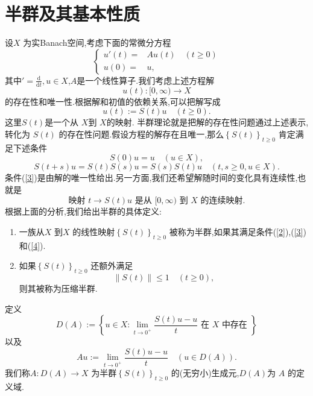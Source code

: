 \section{半群及其基本性质}
  设$X$ 为实Banach空间,考虑下面的常微分方程
  \begin{equation}\label{1}
    \left\{
      \begin{aligned}
	{u}'(t)=&Au(t)\quad (t\ge 0)\\
	{u}(0)=&u,
      \end{aligned}
      \right.
  \end{equation}
  其中$'=\frac{\mathrm{d}}{\mathrm{d}t},u\in X$,$A$是一个线性算子.我们考虑上述方程解
  \[
    {u}(t):[0,\infty)\to X
  \] 的存在性和唯一性.根据解和初值的依赖关系,可以把解写成
\[
  {u}(t):=S(t)u\quad (t\ge 0).
\] 
这里$S(t)$是一个从 $X$到 $X$的映射.
半群理论就是把解的存在性问题通过上述表示,转化为 $S(t)$ 的存在性问题.假设方程的解存在且唯一,那么$\left\{S(t)\right\} _{t\ge 0}$ 肯定满足下述条件
\begin{equation}
  S(0)u=u\quad (u\in X),\label{2}
\end{equation}
\begin{equation}
  S(t+s)u=S(t)S(s)u=S(s)S(t)u \quad (t,s\ge 0, u\in X).\label{3}
\end{equation}
  条件(\ref{3})是由解的唯一性给出.另一方面,我们还希望解随时间的变化具有连续性,也就是
  \begin{equation}
    \text{映射 }t\to S(t)u \text{ 是从 }[0,\infty)\text{ 到 }X  \text{ 的连续映射}.\label{4}
  \end{equation}
  根据上面的分析,我们给出半群的具体定义:
  \begin{definition}
    \begin{enumerate}
      \item 一族从$X$ 到$X$ 的线性映射$\left\{S(t)\right\} _{t\ge 0}$ 被称为半群,如果其满足条件(\ref{2}),(\ref{3})和(\ref{4}).
      \item 如果$\left\{S(t)\right\} _{t\ge 0}$ 还额外满足
	\begin{equation}
	  \|S(t)\|\le 1\quad (t\ge 0),
	\end{equation}
	则其被称为压缩半群.
    \end{enumerate}
  \end{definition}
  \begin{definition}
    定义
    \begin{equation}
      D(A):=\left\{u\in X: \lim_{t\to 0^{+}}\frac{S(t)u-u}{t}\text{ 在 } X  \text{ 中存在 }\right\}
    \end{equation}
    以及
    \begin{equation}
      Au:=\lim_{t\to 0^{+}}\frac{S(t)u-u}{t}\quad (u\in D(A)).
    \end{equation}
    我们称$A:D(A)\to X$ 为半群$\left\{S(t)\right\} _{t\ge 0}$ 的(无穷小)生成元,$D(A)$为 $A$ 的定义域.
  \end{definition}
